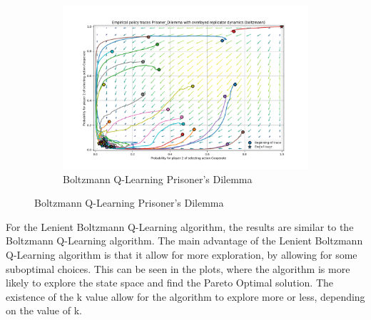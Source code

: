 \documentclass[12pt,letterpaper, onecolumn]{exam}
\begin{document}
\begin{figure}
\begin{subfigure}{.5\textwidth}
      \label{fig:sfigbmp}
    \end{subfigure}%
    \begin{subfigure}{.5\textwidth}
      \centering
      \includegraphics[width=.6\linewidth]{plots/replicator_trajectoreis_Prisoner_Dilemma_boltzmann.png}
      \caption{Boltzmann Q-Learning Prisoner's Dilemma}
      \label{fig:sfigbpd}
    \end{subfigure}%
\end{figure}

For the Lenient Boltzmann Q-Learning algorithm, the results are similar to the Boltzmann Q-Learning algorithm. The main advantage of the Lenient Boltzmann Q-Learning algorithm is that it
allow for more exploration, by allowing for some suboptimal choices. This can be seen in the plots, where the algorithm is more likely to explore the state space and find the Pareto Optimal solution.
The existence of the k value allow for the algorithm to explore more or less, depending on the value of k.
\end{document}
